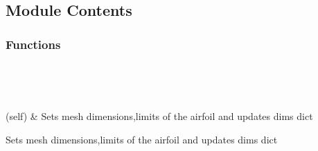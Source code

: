 \documentclass[letterpaper,10pt,english]{sphinxmanual}
\begin{document}
\subsection{Module Contents}
\label{\detokenize{autoapi/dims_func/index:module-contents}}

\subsubsection{Functions}
\label{\detokenize{autoapi/dims_func/index:functions}}

\begin{savenotes}\sphinxatlongtablestart\begin{longtable}[c]{}
\hline

\endfirsthead

%
{}\\
\hline

\endhead

\hline
{}\\
\endfoot

\endlastfoot

\sphinxAtStartPar
{\hyperref[\detokenize{autoapi/dims_func/index:dims_func.set_dims}]{}}(self)
&
\sphinxAtStartPar
Sets mesh dimensions,limits of the airfoil and updates dims dict
\\
\hline
\end{longtable}\sphinxatlongtableend\end{savenotes}

\begin{fulllineitems}
\label{\detokenize{autoapi/dims_func/index:dims_func.set_dims}}
\sphinxAtStartPar
Sets mesh dimensions,limits of the airfoil and updates dims dict

\end{fulllineitems}
\end{document}
